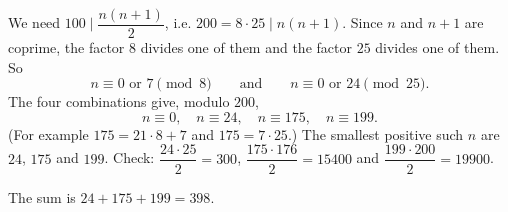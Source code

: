 We need $100\mid\dfrac{n(n+1)}2$, i.e. $200=8\cdot25\mid n(n+1)$. Since $n$ and $n+1$ are coprime, the factor $8$ divides one of them and the factor $25$ divides one of them. So
\[n\equiv0\text{ or }7\pmod8\qquad\text{and}\qquad n\equiv0\text{ or }24\pmod{25}.\]
The four combinations give, modulo $200$,
\[n\equiv0,\quad n\equiv24,\quad n\equiv175,\quad n\equiv199.\]
(For example $175=21\cdot8+7$ and $175=7\cdot25$.) The smallest positive such $n$ are $24$, $175$ and $199$. Check: $\dfrac{24\cdot25}2=300$, $\dfrac{175\cdot176}2=15400$ and $\dfrac{199\cdot200}2=19900$.

The sum is $24+175+199=\boxed{398}$.
